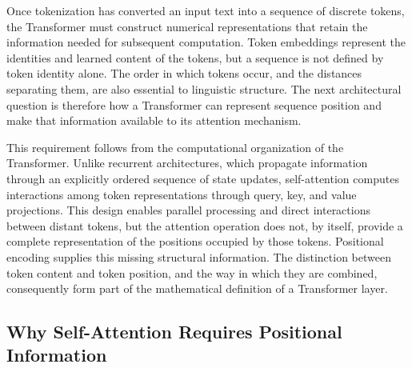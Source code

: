 

Once tokenization has converted an input text into a sequence of discrete
tokens, the Transformer must construct numerical representations that retain
the information needed for subsequent computation. Token embeddings represent
the identities and learned content of the tokens, but a sequence is not
defined by token identity alone. The order in which tokens occur, and the
distances separating them, are also essential to linguistic structure. The
next architectural question is therefore how a Transformer can represent
sequence position and make that information available to its attention
mechanism.

This requirement follows from the computational organization of the
Transformer. Unlike recurrent architectures, which propagate information
through an explicitly ordered sequence of state updates, self-attention
computes interactions among token representations through query, key, and
value projections. This design enables parallel processing and direct
interactions between distant tokens, but the attention operation does not,
by itself, provide a complete representation of the positions occupied by
those tokens. Positional encoding supplies this missing structural
information. The distinction between token content and token position, and
the way in which they are combined, consequently form part of the mathematical
definition of a Transformer layer.


\subsection{Why Self-Attention Requires Positional Information}
\label{subsec:pe-positional-necessity}

